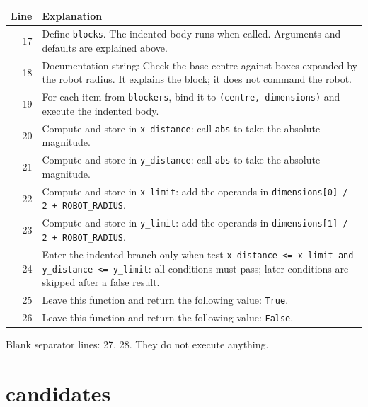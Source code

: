 \documentclass[11pt,a4paper]{book}
\begin{document}
\begin{longtable}{r p{}}

\textbf{Line} & \textbf{Explanation} \\ \hline \endhead

17 & Define \texttt{blocks}. The indented body runs when called. Arguments and defaults are explained above. \\

18 & Documentation string: Check the base centre against boxes expanded by the robot radius. It explains the block; it does not command the robot. \\

19 & For each item from \texttt{blockers}, bind it to \texttt{(centre, dimensions)} and execute the indented body. \\

20 & Compute and store in \texttt{x\_distance}: call \texttt{abs} to take the absolute magnitude.  \\

21 & Compute and store in \texttt{y\_distance}: call \texttt{abs} to take the absolute magnitude.  \\

22 & Compute and store in \texttt{x\_limit}: add the operands in \texttt{dimensions[0] / 2 + ROBOT\_RADIUS}.  \\

23 & Compute and store in \texttt{y\_limit}: add the operands in \texttt{dimensions[1] / 2 + ROBOT\_RADIUS}.  \\

24 & Enter the indented branch only when test \texttt{x\_distance <= x\_limit and y\_distance <= y\_limit}: all conditions must pass; later conditions are skipped after a false result. \\

25 & Leave this function and return the following value: \texttt{True}. \\

26 & Leave this function and return the following value: \texttt{False}. \\

\end{longtable}

Blank separator lines: 27, 28. They do not execute anything.

\section{candidates}
\end{document}
